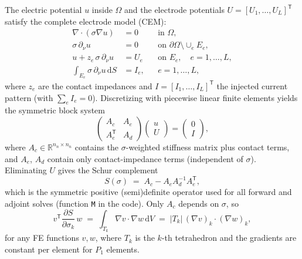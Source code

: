 \documentclass[11pt,a4paper]{article}
\newcommand{\R}{\mathbb{R}}
\newcommand{\dd}{\mathrm{d}}
\newcommand{\T}{\mathsf{T}}
\newcommand{\code}[1]{\texttt{#1}}
\begin{document}
The electric potential $u$ inside $\Omega$ and the electrode potentials
$U = [U_1,\dots,U_L]^\T$ satisfy the complete electrode model (CEM):
\begin{equation}
\label{eq:cem}
\begin{aligned}
  \nabla \cdot (\sigma \nabla u) &= 0 && \text{in } \Omega, \\
  \sigma \, \partial_\nu u &= 0 && \text{on } \partial\Omega \setminus \cup_e E_e, \\
  u + z_e \, \sigma \, \partial_\nu u &= U_e && \text{on } E_e, \quad e = 1,\dots,L, \\
  \int_{E_e} \sigma \, \partial_\nu u \, \dd S &= I_e, && e = 1,\dots,L,
\end{aligned}
\end{equation}
where $z_e$ are the contact impedances and $I = [I_1,\dots,I_L]^\T$ the injected current pattern
(with $\sum_e I_e = 0$). Discretizing with piecewise linear finite elements yields the symmetric
block system
\begin{equation}
  \begin{pmatrix} A_c & A_e \\ A_e^\T & A_d \end{pmatrix}
  \begin{pmatrix} u \\ U \end{pmatrix}
  =
  \begin{pmatrix} 0 \\ I \end{pmatrix},
\end{equation}
where $A_c \in \R^{n_n \times n_n}$ contains the $\sigma$-weighted stiffness matrix plus contact
terms, and $A_e$, $A_d$ contain only contact-impedance terms (independent of $\sigma$).
Eliminating $U$ gives the Schur complement
\begin{equation}
\label{eq:schur}
  S(\sigma) \;=\; A_c - A_e A_d^{-1} A_e^\T,
\end{equation}
which is the symmetric positive (semi)definite operator used for all forward and adjoint solves
(function \code{M} in the code). Only $A_c$ depends on $\sigma$, so
\begin{equation}
\label{eq:dSdsigma}
  v^\T \frac{\partial S}{\partial \sigma_k}\, w
  \;=\; \int_{T_k} \nabla v \cdot \nabla w \, \dd V
  \;=\; |T_k| \, (\nabla v)_k \cdot (\nabla w)_k ,
\end{equation}
for any FE functions $v,w$, where $T_k$ is the $k$-th tetrahedron and the gradients are constant
per element for $P_1$ elements.
\end{document}
